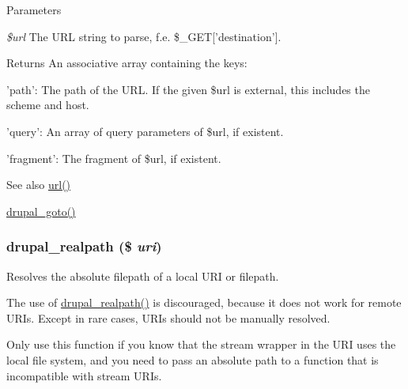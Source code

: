 \begin{DoxyParams}{Parameters}
\item[{\em \$url}]The URL string to parse, f.e. \$\_\-GET\mbox{[}'destination'\mbox{]}.\end{DoxyParams}
\begin{DoxyReturn}{Returns}
An associative array containing the keys:
\begin{DoxyItemize}
\item 'path': The path of the URL. If the given \$url is external, this includes the scheme and host.
\item 'query': An array of query parameters of \$url, if existent.
\item 'fragment': The fragment of \$url, if existent.
\end{DoxyItemize}
\end{DoxyReturn}
\begin{DoxySeeAlso}{See also}
\hyperlink{common_8inc_a43b2a0594431556db49df980801d8807}{url()} 

\hyperlink{group__http__handling_ga5b68d7a934713d1d623b2b32a732235d}{drupal\_\-goto()} 
\end{DoxySeeAlso}
\hypertarget{group__php__wrappers_gafaa5b186c9e78f53b39aae12633eea44}{
\subsubsection[{drupal\_\-realpath}]{\setlength{\rightskip}{0pt plus 5cm}drupal\_\-realpath (\$ {\em uri})}}
\label{group__php__wrappers_gafaa5b186c9e78f53b39aae12633eea44}
Resolves the absolute filepath of a local URI or filepath.

The use of \hyperlink{group__php__wrappers_gafaa5b186c9e78f53b39aae12633eea44}{drupal\_\-realpath()} is discouraged, because it does not work for remote URIs. Except in rare cases, URIs should not be manually resolved.

Only use this function if you know that the stream wrapper in the URI uses the local file system, and you need to pass an absolute path to a function that is incompatible with stream URIs.


